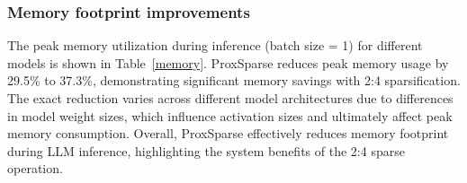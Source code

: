 \subsubsection{Memory footprint improvements}

The peak memory utilization during inference (batch size = 1) for different models is shown in Table~\ref{memory}. ProxSparse reduces peak memory usage by 29.5\% to 37.3\%, demonstrating significant memory savings with 2:4 sparsification. The exact reduction varies across different model architectures due to differences in model weight sizes, which influence activation sizes and ultimately affect peak memory consumption. Overall, ProxSparse effectively reduces memory footprint during LLM inference, highlighting the system benefits of the 2:4 sparse operation.

\begin{table}[ht]
    \centering
    \caption{Speedup and memory utilization improvements achieved by ProxSparse with 2:4 sparsity (left: speedup, right: memory reduction). ProxSparse delivers a 1.3x–1.35x speedup for matrix multiplication and a 1.26x end-to-end inference speedup on the Mistral-v0.3-7b model. Additionally, ProxSparse reduces memory consumption by 29.5\%–37.3\% across different models, demonstrating its efficiency in both computation and memory usage.}
    \label{memory}
\end{table}
\fi